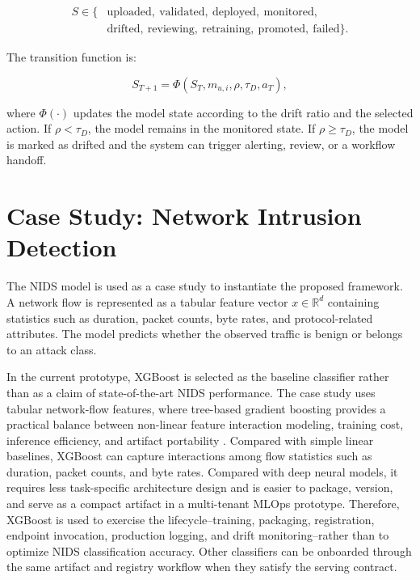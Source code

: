 \documentclass[runningheads]{llncs}
\begin{document}
\begin{equation}
\begin{split}
S \in \{&
\mathrm{uploaded},\ \mathrm{validated},\ \mathrm{deployed},\
\mathrm{monitored},\\
&\mathrm{drifted},\ \mathrm{reviewing},\ \mathrm{retraining},\
\mathrm{promoted},\ \mathrm{failed}
\}.
\end{split}
\end{equation}

The transition function is:

\begin{equation}
S_{T+1}=\Phi(S_T,m_{u,i},\rho,\tau_D,a_T),
\end{equation}

where $\Phi(\cdot)$ updates the model state according to the drift ratio and the selected action. If $\rho < \tau_D$, the model remains in the monitored state. If $\rho \geq \tau_D$, the model is marked as drifted and the system can trigger alerting, review, or a workflow handoff.

\section{Case Study: Network Intrusion Detection}

The NIDS model is used as a case study to instantiate the proposed framework. A network flow is represented as a tabular feature vector $x \in \mathbb{R}^{d}$ containing statistics such as duration, packet counts, byte rates, and protocol-related attributes. The model predicts whether the observed traffic is benign or belongs to an attack class.

In the current prototype, XGBoost is selected as the baseline classifier rather than as a claim of state-of-the-art NIDS performance. The case study uses tabular network-flow features, where tree-based gradient boosting provides a practical balance between non-linear feature interaction modeling, training cost, inference efficiency, and artifact portability \cite{xgboost}. Compared with simple linear baselines, XGBoost can capture interactions among flow statistics such as duration, packet counts, and byte rates. Compared with deep neural models, it requires less task-specific architecture design and is easier to package, version, and serve as a compact artifact in a multi-tenant MLOps prototype. Therefore, XGBoost is used to exercise the lifecycle--training, packaging, registration, endpoint invocation, production logging, and drift monitoring--rather than to optimize NIDS classification accuracy. Other classifiers can be onboarded through the same artifact and registry workflow when they satisfy the serving contract.
\end{document}

